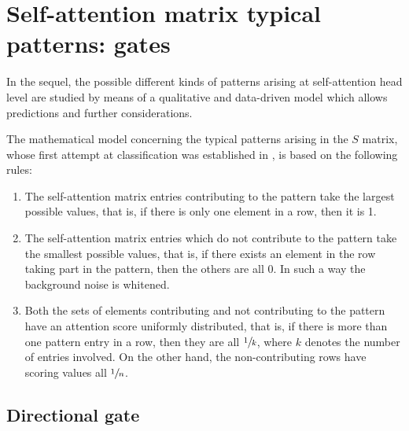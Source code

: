 \documentclass[11pt,a4paper,reqno]{amsart} %
\theoremstyle{definition}
\numberwithin{equation}{section}          %
\begin{document}
\section{Self-attention matrix typical patterns: gates}

In the sequel, the possible different kinds of patterns arising at self-attention head level are studied by means of a qualitative and data-driven model which allows predictions and further considerations.

The mathematical model concerning the typical patterns arising in the $S$ matrix, whose first attempt at classification was established in \cite{rev}, is based on the following rules:
\begin{enumerate}
\item The self-attention matrix entries contributing to the pattern take the largest possible values, that is, if there is only one element in a row, then it is 1. 
\item The self-attention matrix entries which do not contribute to the pattern take the smallest possible values, that is, if there exists an element in the row taking part in the pattern, then the others are all 0. In such a way the background noise is whitened.
\item Both the sets of elements contributing and not contributing to the pattern have an attention score uniformly distributed, that is, if there is more than one pattern entry in a row, then they are all $\sfrac{1}{k}$, where $k$ denotes the number of entries involved. On the other hand, the non-contributing rows have scoring values all $\sfrac{1}{n}$.
\end{enumerate}

\subsection{Directional gate}
\end{document}
